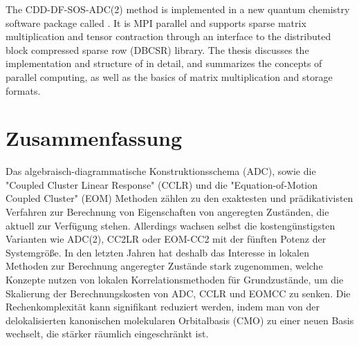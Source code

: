 The CDD-DF-SOS-ADC(2) method is implemented in a new quantum chemistry software package called \mchem{}. It is MPI parallel and supports sparse matrix multiplication and tensor contraction through an interface to the distributed block compressed sparse row (DBCSR) library. The thesis discusses the implementation and structure of \mchem{} in detail, and summarizes the concepts of parallel computing, as well as the basics of matrix multiplication and storage formats.

\chapter*{Zusammenfassung}

Das algebraisch-diagrammatische Konstruktionsschema (ADC), sowie die "{}Coupled Cluster Linear Response"{} (CCLR) und die "{}Equation-of-Motion Coupled Cluster"{} (EOM) Methoden zählen zu den exaktesten und prädikativisten Verfahren zur Berechnung von Eigenschaften von angeregten Zuständen, die aktuell zur Verfügung stehen. 
Allerdings wachsen selbst die kostengünstigsten Varianten wie ADC(2), CC2LR oder EOM-CC2 mit der fünften Potenz der Systemgrö{\ss}e.
In den letzten Jahren hat deshalb das Interesse in lokalen Methoden zur Berechnung angeregter Zustände stark zugenommen, welche Konzepte nutzen von lokalen Korrelationsmethoden für Grundzustände, um die Skalierung der Berechnungskosten von ADC, CCLR und EOMCC zu senken. 
Die Rechenkomplexität kann signifikant reduziert werden, indem man von der delokalisierten kanonischen molekularen Orbitalbasis (CMO) zu einer neuen Basis wechselt, die stärker räumlich eingeschränkt ist. 

